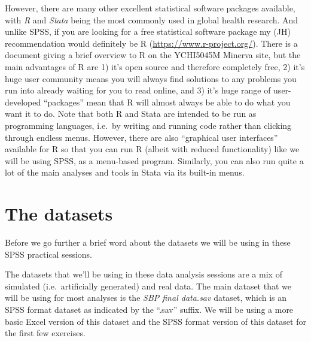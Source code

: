 \documentclass[
]{book}
\begin{document}
However, there are many other excellent statistical software packages available, with \emph{R} and \emph{Stata} being the most commonly used in global health research. And unlike SPSS, if you are looking for a free statistical software package my (JH) recommendation would definitely be R (\url{https://www.r-project.org/}). There is a document giving a brief overview to R on the YCHI5045M Minerva site, but the main advantages of R are 1) it's open source and therefore completely free, 2) it's huge user community means you will always find solutions to any problems you run into already waiting for you to read online, and 3) it's huge range of user-developed ``packages'' mean that R will almost always be able to do what you want it to do. Note that both R and Stata are intended to be run as programming languages, i.e.~by writing and running code rather than clicking through endless menus. However, there are also ``graphical user interfaces'' available for R so that you can run R (albeit with reduced functionality) like we will be using SPSS, as a menu-based program. Similarly, you can also run quite a lot of the main analyses and tools in Stata via its built-in menus.

\hypertarget{the-datasets}{%
\section{The datasets}\label{the-datasets}}

Before we go further a brief word about the datasets we will be using in these SPSS practical sessions.

The datasets that we'll be using in these data analysis sessions are a mix of simulated (i.e.~artificially generated) and real data. The main dataset that we will be using for most analyses is the \emph{SBP final data.sav} dataset, which is an SPSS format dataset as indicated by the ``.sav'' suffix. We will be using a more basic Excel version of this dataset and the SPSS format version of this dataset for the first few exercises.
\end{document}
